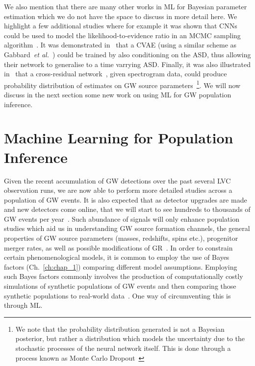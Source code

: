 %
%
We also mention that there are many other works in \ac{ML} 
for Bayesian parameter estimation which we do not have the 
space to discuss in more detail here. We highlight a few 
additional studies where for example it was shown that \acp{CNN} could 
be used to model the likelihood-to-evidence ratio in 
an \ac{MCMC} sampling algorithm~\cite{2020arXiv201012931D}. It was demonstrated 
in~\cite{2021arXiv210710730K} that a \ac{CVAE} (using a similar scheme 
as Gabbard~\textit{et al.}~\cite{1909.06296}) could be trained by 
also conditioning on the \ac{ASD}, thus allowing their network to generalise 
to a time varrying \ac{ASD}. Finally, it was also illustrated
in~\cite{2021CQGra..38o5010A} that 
a cross-residual network~\cite{2018arXiv181201187H}, 
given spectrogram data, could produce 
probability distribution of estimates on \ac{GW} source parameters~\footnote{
We note that the probability distribution generated is not a Bayesian 
posterior, but rather a distribution which models the uncertainty due to 
the stochastic processes of the neural network itself. This is done 
through a process known as Monte Carlo Dropout~\cite{2015arXiv150602142G}}. 
We will now discuss in the next section some new work on 
using \ac{ML} for \ac{GW} population inference.

\section{Machine Learning for Population Inference}

%
%
Given the recent accumulation of \ac{GW} detections over the 
past several \ac{LVC} observation runs, we are now able to 
perform more detailed studies across a population of 
\ac{GW} events. It is also expected that as detector 
upgrades are made and new detectors come online, that we will start to 
see hundreds to thousands of \ac{GW} events per
year~\cite{2018LRR....21....3A}. Such abundance of signals will 
only enhance population studies which aid us in understanding 
\ac{GW} source formation channels, the general properties of \ac{GW} 
source parameters  (masses, redshifts, spins etc.), progenitor 
merger rates, as well as possible modifications of
\ac{GR}~\cite{Abbott_2019}. In order to constrain certain 
phenomenological models, it is common to employ the use of 
Bayes factors (Ch.~\ref{ch:chap_1}) comparing different model assumptions.
Employing such Bayes factors commonly involves the production of 
computationally costly simulations of synthetic populations 
of \ac{GW} events and then comparing those synthetic populations to 
real-world data~\cite{Zevin_2017}. One way of circumventing this 
is through \ac{ML}. 

